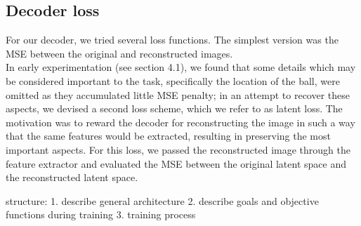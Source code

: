 \subsection{Decoder loss}
For our decoder, we tried several loss functions. The simplest version was the MSE between the original and reconstructed images. \\
In early experimentation (see section 4.1), we found that some details which may be considered important to the task, specifically the location of the ball, were omitted as they accumulated little MSE penalty; in an attempt to recover these aspects, we devised a second loss scheme, which we refer to as latent loss. The motivation was to reward the decoder for reconstructing the image in such a way that the same features would be extracted, resulting in preserving the most important aspects. For this loss, we passed the reconstructed image through the feature extractor and evaluated the MSE between the original latent space and the reconstructed latent space.










structure:
1. describe general architecture
2. describe goals and objective functions during training
3. training process